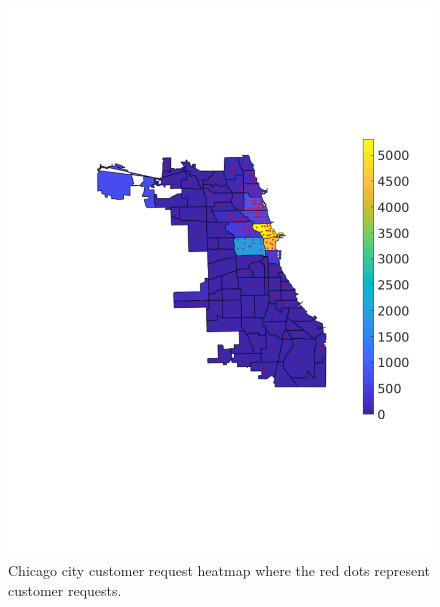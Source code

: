 \documentclass[journal]{IEEEtran}
\begin{document}
\begin{figure}
    \centering
    \includegraphics[scale = 0.45, trim={3cm 6cm 0cm 6cm}, clip]{chicago_customer_request_heatmap.pdf}
    \caption{Chicago city customer request heatmap where the red dots represent customer requests.}
    \label{fig:chicago_customer_heatmap}
\end{figure}
\end{document}
